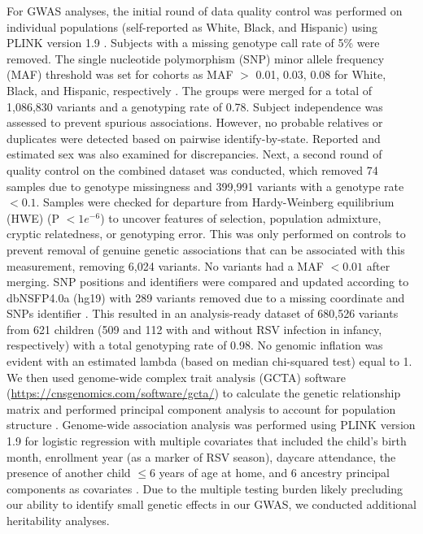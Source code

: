 \documentclass{article} %
\begin{document}
For GWAS analyses, the initial round of data quality control was performed on individual populations (self-reported as White, Black, and  Hispanic) using PLINK version 1.9 
\citep{purcell2007plink}.
Subjects with a missing genotype call rate of 5\% were removed. 
The single nucleotide polymorphism (SNP) minor allele frequency (MAF) threshold was set for cohorts as MAF $> $ 0.01, 0.03, 0.08 for White, Black, and Hispanic, respectively
\citep{liu2016dbnsfp}.
The groups were merged for a total of 1,086,830 variants and a genotyping rate of 0.78. 
Subject independence was assessed to prevent spurious associations. 
However, no probable relatives or duplicates were detected based on pairwise identify-by-state. 
Reported and estimated sex was also examined for discrepancies. 
Next, a second round of quality control on the combined dataset was conducted, which removed 74 samples due to genotype missingness and 399,991 variants with a genotype rate $< 0.1$. 
Samples were checked for departure from Hardy-Weinberg equilibrium (HWE) (P $< 1e^{-6}$) to uncover features of selection, population admixture, cryptic relatedness, or genotyping error. 
This was only performed on controls to prevent removal of genuine genetic associations that can be associated with this measurement, removing 6,024 variants. 
No variants had a MAF $< 0.01$ after merging. 
SNP positions and identifiers were compared and updated according to dbNSFP4.0a (hg19) with 289 variants removed due to a missing coordinate and SNPs identifier
\citep{liu2016dbnsfp}.
This resulted in an analysis-ready dataset of 680,526 variants from 621 children (509 and 112 with and without RSV infection in infancy, respectively) with a total genotyping rate of 0.98. 
No genomic inflation was evident with an estimated lambda (based on median chi-squared test) equal to 1. 
We then used genome-wide complex trait analysis (GCTA) software (\url{https://cnsgenomics.com/software/gcta/}) to calculate the genetic relationship matrix and performed principal component analysis to account for population structure
\citep{yang2011gcta}.
Genome-wide association analysis was performed using PLINK version 1.9 for logistic regression with multiple covariates that included the child's birth month, enrollment year (as a marker of RSV season), daycare attendance, the presence of another child $\le 6$ years of age at home, and 6 ancestry principal components as covariates
\citep{purcell2007plink}.
Due to the multiple testing burden likely precluding our ability to identify small genetic effects in our GWAS, we conducted additional heritability analyses.
\end{document}
